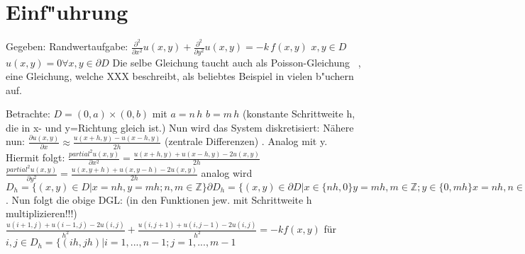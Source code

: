 \section{Einf"uhrung}
Gegeben: Randwertaufgabe: 
$\frac{\partial ^2}{\partial x^2}u(x,y)+\frac{\partial ^2}{\partial y^2}u(x,y)=-k\,f(x,y)$ $x,y \in D $
 $u(x,y)=0 \forall x,y \in \partial D$
Die selbe Gleichung taucht auch als \glqq Poisson-Gleichung \grqq\, , eine Gleichung, welche XXX beschreibt, als beliebtes Beispiel in vielen b"uchern auf.

Betrachte: $D=(0,a)\times (0,b)$ mit $a=n\,h$ $b=m\, h$ (konstante Schrittweite h, die in x- und y=Richtung gleich ist.)
Nun wird das System diskretisiert:
Nähere nun: $\frac{\partial u(x,y)}{\partial x} \approx \frac{u(x+h, y)-u(x-h,y)}{2h}$ (zentrale Differenzen) . Analog mit y. Hiermit folgt:
$\frac{partial^2 u(x,y)}{\partial x^2}=\frac{u(x+h,y)+u(x-h,y)-2u(x,y)}{2h}$
$\frac{partial^2 u(x,y)}{\partial y^2}=\frac{u(x,y+h)+u(x,y-h)-2u(x,y)}{2h}$
analog wird $D_h=\{(x,y)\in D | x=nh, y=mh ; n,m \in \mathbb{Z}\} \partial D_h=\{(x,y) \in \partial D | x \in \{ nh, 0\} y= mh, m\in \mathbb{Z}; y \in \{0, mh\} x=nh, n\in \mathbb{Z}\}$. 
Nun folgt die obige DGL: (in den Funktionen jew. mit Schrittweite h multiplizieren!!!)
$\frac{u(i+1,j)+u(i-1,j)-2u(i,j)}{h^2}+\frac{u(i,j+1)+u(i,j-1)-2u(i,j)}{h^2}=-k f(x,y)$ für $i,j \in D_h=\{(ih,jh)|i=1,...,n-1; j=1,...,m-1$

